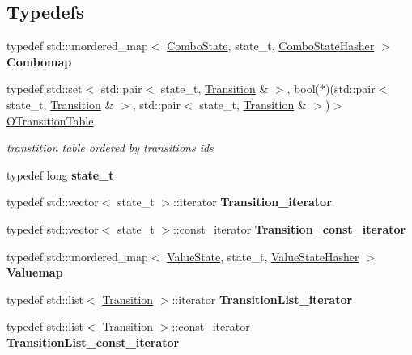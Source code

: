 \subsection*{Typedefs}
\begin{DoxyCompactItemize}
\item 
\mbox{\label{group__schemata_ga5f54dbbcb6e551cd56a12c9d9711f82e}} 
typedef std\+::unordered\+\_\+map$<$ \mbox{\hyperlink{classComboState}{Combo\+State}}, state\+\_\+t, \mbox{\hyperlink{structComboStateHasher}{Combo\+State\+Hasher}} $>$ {\bfseries Combomap}
\item 
\mbox{\label{group__schemata_ga34fd7500c532fc3af1419927d6102bb4}} 
typedef std\+::set$<$ std\+::pair$<$ state\+\_\+t, \mbox{\hyperlink{classTransition}{Transition}} \& $>$, bool($\ast$)(std\+::pair$<$ state\+\_\+t, \mbox{\hyperlink{classTransition}{Transition}} \& $>$, std\+::pair$<$ state\+\_\+t, \mbox{\hyperlink{classTransition}{Transition}} \& $>$)$>$ \mbox{\hyperlink{group__schemata_ga34fd7500c532fc3af1419927d6102bb4}{O\+Transition\+Table}}
\begin{DoxyCompactList}\small\item\em transtition table ordered by transition\textquotesingle{}s ids \end{DoxyCompactList}\item 
\mbox{\label{group__schemata_gabd0a920032a3757e491c0f765beb9657}} 
typedef long {\bfseries state\+\_\+t}
\item 
\mbox{\label{group__schemata_gacb03191d1927740d0f6f55d525eec2be}} 
typedef std\+::vector$<$ state\+\_\+t $>$\+::iterator {\bfseries Transition\+\_\+iterator}
\item 
\mbox{\label{group__schemata_gada53f8336fc15b6740d915faaa812651}} 
typedef std\+::vector$<$ state\+\_\+t $>$\+::const\+\_\+iterator {\bfseries Transition\+\_\+const\+\_\+iterator}
\item 
\mbox{\label{group__schemata_ga881b5f6757c004ef80638824b4057ad3}} 
typedef std\+::unordered\+\_\+map$<$ \mbox{\hyperlink{classValueState}{Value\+State}}, state\+\_\+t, \mbox{\hyperlink{structValueStateHasher}{Value\+State\+Hasher}} $>$ {\bfseries Valuemap}
\item 
\mbox{\label{group__schemata_gaf9f065672b84540dc2310cee57062b5d}} 
typedef std\+::list$<$ \mbox{\hyperlink{classTransition}{Transition}} $>$\+::iterator {\bfseries Transition\+List\+\_\+iterator}
\item 
\mbox{\label{group__schemata_gac6a3bf271d488fbc785617cb246215f3}} 
typedef std\+::list$<$ \mbox{\hyperlink{classTransition}{Transition}} $>$\+::const\+\_\+iterator {\bfseries Transition\+List\+\_\+const\+\_\+iterator}
\end{DoxyCompactItemize}
